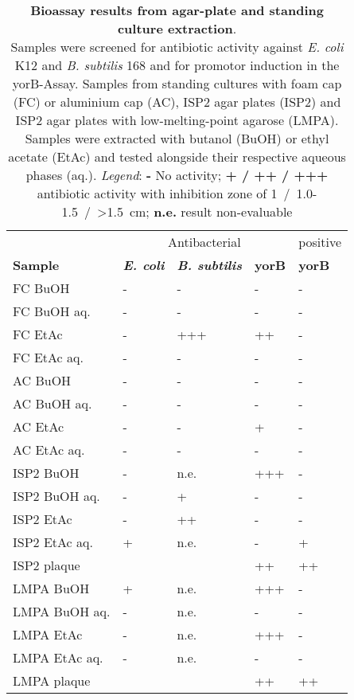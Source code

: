     \begin{table}[htbp]
        \caption[Bioassay results from agar-plate and standing culture extraction]{\textbf{Bioassay results from agar-plate and standing culture extraction}.\\
        Samples were screened for antibiotic activity against \textit{E. coli} K12 and \textit{B. subtilis} 168 and for promotor induction in the yorB-Assay.
        Samples from standing cultures with foam cap (FC) or aluminium cap (AC), ISP2 agar plates (ISP2) and ISP2 agar plates with low-melting-point agarose (LMPA). Samples were extracted with butanol (BuOH) or ethyl acetate (EtAc) and tested alongside their respective aqueous phases (aq.). \emph{Legend}: \textbf{-} No activity; \textbf{+ / ++ / +++} antibiotic activity with inhibition zone of 1~/~1.0-1.5~/~>1.5~cm; \textbf{n.e.} result non-evaluable}
        \label{tab:yorB_assay_results}
        \centering
        \begin{tabularx}{\textwidth}{XXXXX}
            \toprule
            & \multicolumn{3}{c}{Antibacterial} & positive \\
            \cline{2-4}
            \textbf{Sample} & \textbf{\textit{E. coli}}     & \textbf{\textit{B. subtilis}}  & \textbf{yorB}  & \textbf{yorB}    \\
            \midrule
            FC BuOH         & -     & -     & -     & -    \\
            FC BuOH aq.     & -     & -     & -     & -    \\
            FC EtAc         & -     & +++   & ++    & -    \\
            FC EtAc aq.     & -     & -     & -     & -    \\
            AC BuOH         & -     & -     & -     & -    \\
            AC BuOH aq.     & -     & -     & -     & -    \\
            AC EtAc         & -     & -     & +     & -    \\
            AC EtAc aq.     & -     & -     & -     & -    \\
            ISP2 BuOH       & -     & n.e.  & +++   & -    \\
            ISP2 BuOH aq.   & -     & +     & -     & -    \\
            ISP2 EtAc       & -     & ++    & -     & -    \\
            ISP2 EtAc aq.   & +     & n.e.  & -     & +    \\
            ISP2 plaque     &       &       & ++    & ++   \\
            LMPA BuOH       & +     & n.e.  & +++   & -    \\
            LMPA BuOH aq.   & -     & n.e.  & -     & -    \\
            LMPA EtAc       & -     & n.e.  & +++   & -    \\
            LMPA EtAc aq.   & -     & n.e.  & -     & -    \\
            LMPA plaque     &       &       & ++    & ++   \\
            \bottomrule
        \end{tabularx}
    \end{table}
